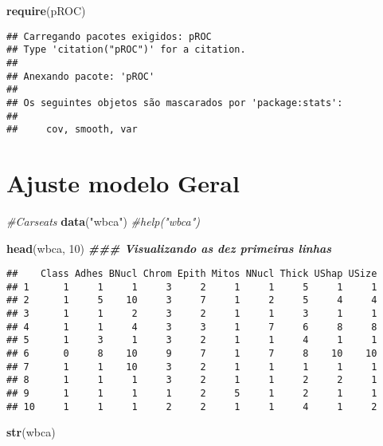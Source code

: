 \documentclass[
]{article}
\newenvironment{Shaded}{\begin{snugshade}}{\end{snugshade}}
\newcommand{\CommentTok}[1]{\textcolor[rgb]{0.56,0.35,0.01}{\textit{#1}}}
\newcommand{\DecValTok}[1]{\textcolor[rgb]{0.00,0.00,0.81}{#1}}
\newcommand{\DocumentationTok}[1]{\textcolor[rgb]{0.56,0.35,0.01}{\textbf{\textit{#1}}}}
\newcommand{\FunctionTok}[1]{\textcolor[rgb]{0.13,0.29,0.53}{\textbf{#1}}}
\newcommand{\NormalTok}[1]{#1}
\newcommand{\StringTok}[1]{\textcolor[rgb]{0.31,0.60,0.02}{#1}}
\begin{document}
\begin{Shaded}
\begin{Highlighting}[]
\FunctionTok{require}\NormalTok{(pROC)}
\end{Highlighting}
\end{Shaded}

\begin{verbatim}
## Carregando pacotes exigidos: pROC
## Type 'citation("pROC")' for a citation.
## 
## Anexando pacote: 'pROC'
## 
## Os seguintes objetos são mascarados por 'package:stats':
## 
##     cov, smooth, var
\end{verbatim}

\section{Ajuste modelo Geral}\label{ajuste-modelo-geral}

\begin{Shaded}
\begin{Highlighting}[]
\CommentTok{\#Carseats}
\FunctionTok{data}\NormalTok{(}\StringTok{"wbca"}\NormalTok{) }
\CommentTok{\#help("wbca")}

\FunctionTok{head}\NormalTok{(wbca, }\DecValTok{10}\NormalTok{) }\DocumentationTok{\#\#\# Visualizando as dez primeiras linhas}
\end{Highlighting}
\end{Shaded}

\begin{verbatim}
##    Class Adhes BNucl Chrom Epith Mitos NNucl Thick UShap USize
## 1      1     1     1     3     2     1     1     5     1     1
## 2      1     5    10     3     7     1     2     5     4     4
## 3      1     1     2     3     2     1     1     3     1     1
## 4      1     1     4     3     3     1     7     6     8     8
## 5      1     3     1     3     2     1     1     4     1     1
## 6      0     8    10     9     7     1     7     8    10    10
## 7      1     1    10     3     2     1     1     1     1     1
## 8      1     1     1     3     2     1     1     2     2     1
## 9      1     1     1     1     2     5     1     2     1     1
## 10     1     1     1     2     2     1     1     4     1     2
\end{verbatim}

\begin{Shaded}
\begin{Highlighting}[]
\FunctionTok{str}\NormalTok{(wbca)}
\end{Highlighting}
\end{Shaded}
\end{document}
